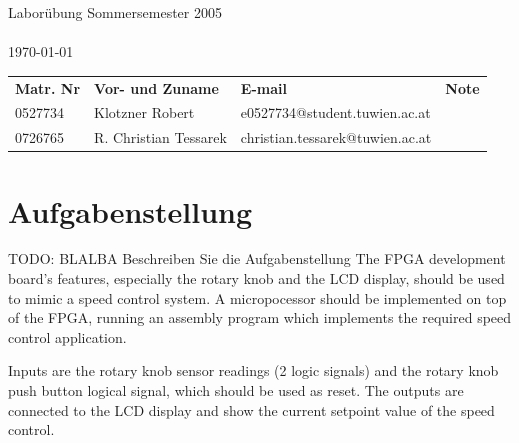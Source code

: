 \documentclass[a4paper,10pt]{scrartcl}
\begin{document}
\begin{titlepage}
\begin{center}
\begin{Large}

\sffamily \vspace*{\fill}{Institut f\"ur Computertechnik\\
Labor integrierte Schaltungen\\
384.088\\}
\vfill { Labor\"ubung Sommersemester 2005\\}
\vspace{10mm}{Betreuer: Herr Nachtnebel}\\
\today\\
\end{Large}
\vfill

\begin{tabular}{llll}
\textbf{Matr. Nr} & \textbf{Vor- und Zuname} & \textbf{E-mail} & \textbf{Note} \\
0527734 & Klotzner Robert & e0527734@student.tuwien.ac.at &  \\
0726765 & R. Christian Tessarek & christian.tessarek@tuwien.ac.at &
\end{tabular}

\end{center}
\end{titlepage}



\pagebreak
\tableofcontents
\pagebreak


\section{Aufgabenstellung}
\label{sec:aufgabe}

TODO: BLALBA Beschreiben Sie die Aufgabenstellung
The FPGA development board's features, especially the rotary knob and the LCD display, should be used to mimic a speed control system. 
A micropocessor should be implemented on top of the FPGA, running an assembly program which implements the required speed control application. 

Inputs are the rotary knob sensor readings (2 logic signals) and the rotary knob push button logical signal, which should be used as reset. 
The outputs are connected to the LCD display and show the current setpoint value of the speed control. 
\end{document}

